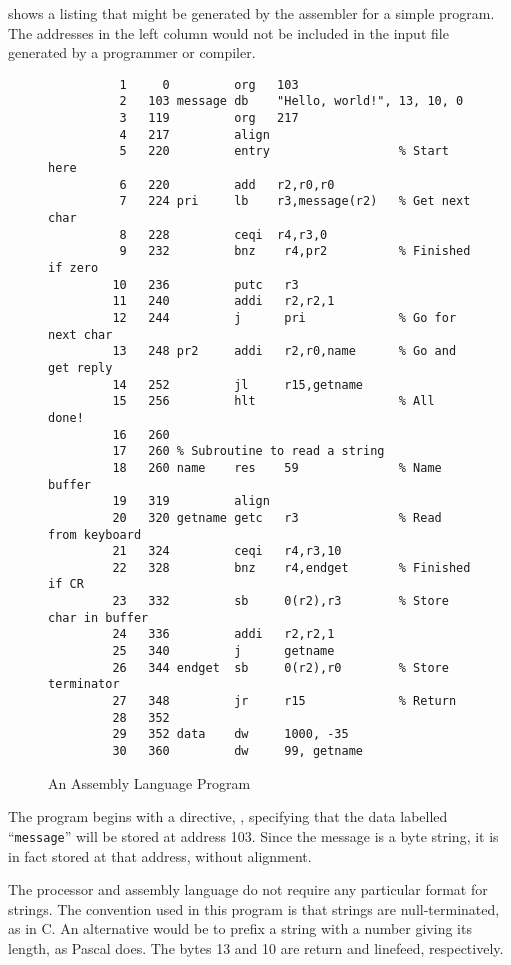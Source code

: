  shows a listing that might be generated by the assembler for a
simple program. The addresses in the left column would not be included
in the input file generated by a programmer or compiler.

\begin{figure}[hbtp]
\begin{verbatim}
          1     0         org   103
          2   103 message db    "Hello, world!", 13, 10, 0
          3   119         org   217
          4   217         align
          5   220         entry                  % Start here
          6   220         add   r2,r0,r0
          7   224 pri     lb    r3,message(r2)   % Get next char
          8   228         ceqi  r4,r3,0
          9   232         bnz    r4,pr2          % Finished if zero
         10   236         putc   r3
         11   240         addi   r2,r2,1
         12   244         j      pri             % Go for next char
         13   248 pr2     addi   r2,r0,name      % Go and get reply
         14   252         jl     r15,getname
         15   256         hlt                    % All done!
         16   260
         17   260 % Subroutine to read a string
         18   260 name    res    59              % Name buffer
         19   319         align
         20   320 getname getc   r3              % Read from keyboard
         21   324         ceqi   r4,r3,10
         22   328         bnz    r4,endget       % Finished if CR
         23   332         sb     0(r2),r3        % Store char in buffer
         24   336         addi   r2,r2,1
         25   340         j      getname
         26   344 endget  sb     0(r2),r0        % Store terminator
         27   348         jr     r15             % Return
         28   352
         29   352 data    dw     1000, -35
         30   360         dw     99, getname
\end{verbatim}
\caption{An Assembly Language Program}
\label{prog}
\end{figure}

The program begins with a directive, , specifying that the data
labelled ``{\tt message}'' will be stored at address 103. Since the
message is a byte string, it is in fact stored at that address, without
alignment.

The processor and assembly language do not require any particular format
for strings. The convention used in this program is that strings are
null-terminated, as in C. An alternative would be to prefix a string
with a number giving its length, as Pascal does. The bytes 13 and 10 are
{\sc return} and {\sc linefeed}, respectively.

